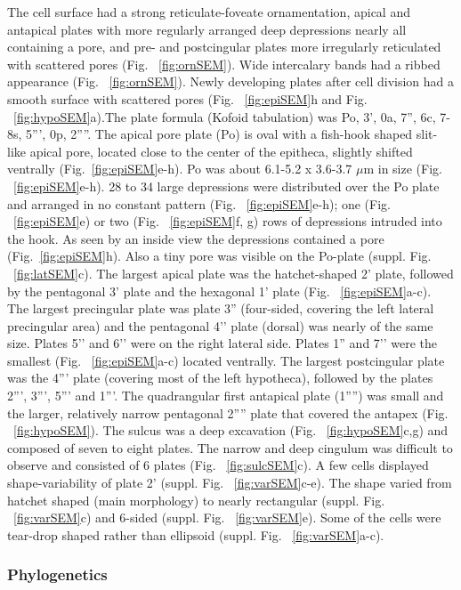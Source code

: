 \documentclass[12pt]{article}
\begin{document}
The cell surface had a strong  reticulate-foveate ornamentation, apical and antapical plates with more regularly arranged deep depressions nearly all containing a pore, and pre- and postcingular plates more irregularly reticulated with scattered pores (Fig. ~\ref{fig:ornSEM}). Wide intercalary bands had a ribbed appearance (Fig. ~\ref{fig:ornSEM}). Newly developing plates after cell division had a smooth surface with scattered pores (Fig. ~\ref{fig:epiSEM}h and Fig. ~\ref{fig:hypoSEM}a).The plate formula (Kofoid tabulation) was Po, 3', 0a, 7'', 6c, 7-8s, 5''', 0p, 2''''. The apical pore plate (Po) is oval with a fish-hook shaped slit-like apical pore, located close to the center of the epitheca, slightly shifted ventrally (Fig.~\ref{fig:epiSEM}e-h). Po was about 6.1-5.2 x 3.6-3.7 $\mu$m in size (Fig. ~\ref{fig:epiSEM}e-h). 28 to 34 large depressions were distributed over the Po plate and arranged in no constant pattern (Fig. ~\ref{fig:epiSEM}e-h); one (Fig. ~\ref{fig:epiSEM}e) or two (Fig. ~\ref{fig:epiSEM}f, g) rows of depressions intruded into the hook. As seen by an inside view the depressions contained a pore (Fig.~\ref{fig:epiSEM}h). Also a tiny pore was visible on the Po-plate (suppl. Fig. ~\ref{fig:latSEM}c). The largest apical plate was the hatchet-shaped 2' plate, followed by the pentagonal 3' plate and the hexagonal 1' plate (Fig. ~\ref{fig:epiSEM}a-c). The largest precingular plate was plate 3'' (four-sided, covering the left lateral precingular area) and the pentagonal 4’’ plate (dorsal) was nearly of the same size. Plates 5’’ and 6’’ were on the right lateral side. Plates 1” and 7’’ were the smallest (Fig. ~\ref{fig:epiSEM}a-c) located ventrally. The largest postcingular plate was the 4''' plate (covering most of the left hypotheca), followed by the plates 2''', 3''', 5''' and 1'''. The quadrangular first antapical plate (1'''') was small and the larger, relatively narrow pentagonal 2'''' plate that covered the antapex (Fig. ~\ref{fig:hypoSEM}). The sulcus was a deep excavation (Fig. ~\ref{fig:hypoSEM}c,g) and composed of seven to eight plates. The narrow and deep cingulum was difficult to observe and consisted of 6 plates (Fig. ~\ref{fig:sulcSEM}c).
A few cells displayed shape-variability of plate 2' (suppl. Fig. ~\ref{fig:varSEM}c-e). The shape varied from hatchet shaped (main morphology) to nearly rectangular (suppl. Fig. ~\ref{fig:varSEM}c) and 6-sided (suppl. Fig. ~\ref{fig:varSEM}e). Some of the cells were tear-drop shaped rather than ellipsoid (suppl. Fig. ~\ref{fig:varSEM}a-c). 

\subsubsection{Phylogenetics}
\end{document}
